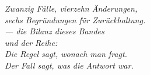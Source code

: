 \bigskip
\begin{flushright}
\itshape\color{grau}
Zwanzig Fälle, vierzehn Änderungen,\\
sechs Begründungen für Zurückhaltung.\\[10pt]
\normalfont\color{grau}\upshape
--- die Bilanz dieses Bandes\\
\itshape und der Reihe:\\
Die Regel sagt, wonach man fragt.\\
Der Fall sagt, was die Antwort war.
\end{flushright}
